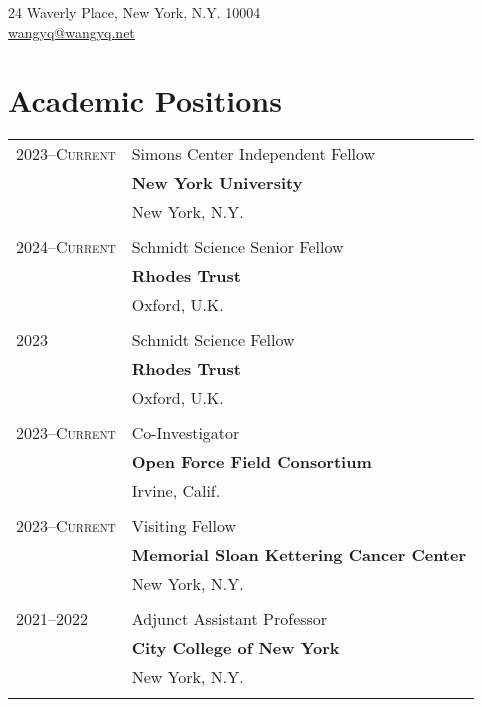 \begin{center}

24 Waverly Place,
New York, N.Y. 10004\\
\href{mailto:wangyq@wangyq.net}{wangyq@wangyq.net}\\
\end{center}

\vspace{10pt}


\section{Academic Positions}
\begin{longtable}{p{} p{} }
\textsc{2023--Current} & Simons Center Independent Fellow \\
& \textbf{New York University} \\
& New York, N.Y. \\\\

\textsc{2024--Current} & Schmidt Science Senior Fellow \\
& \textbf{Rhodes Trust} \\
& Oxford, U.K. \\\\

\textsc{2023} & Schmidt Science Fellow \\
& \textbf{Rhodes Trust} \\
& Oxford, U.K. \\\\

\textsc{2023--Current} & Co-Investigator\\
& \textbf{Open Force Field Consortium} \\
& Irvine, Calif. \\\\

\textsc{2023--Current} & Visiting Fellow\\
& \textbf{Memorial Sloan Kettering Cancer Center} \\
& New York, N.Y. \\\\

\textsc{2021--2022} & Adjunct Assistant Professor\\
& \textbf{City College of New York} \\
& New York, N.Y. \\\\

\end{longtable}


